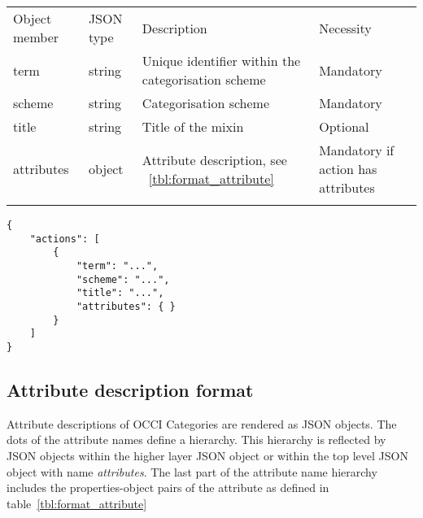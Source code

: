 \documentclass[10pt,a4paper]{article}
\begin{document}
 {
    \begin{tabular}{llll}
    \toprule
    Object member & JSON type & Description & Necessity\\
    \colrule
    term & string & Unique identifier within the categorisation scheme & Mandatory\\
    scheme & string & Categorisation scheme & Mandatory\\
    title & string & Title of the mixin & Optional\\
    attributes & object & Attribute description, see ~\ref{tbl:format_attribute} & Mandatory if action has attributes\\
    \botrule
    \end{tabular}
}

\begin{verbatim}
{
    "actions": [
        {
            "term": "...",
            "scheme": "...",
            "title": "...",
            "attributes": { }
        }
	]
}
\end{verbatim}

\subsection{Attribute description format}
\label{sec:format_attribute_description}

Attribute descriptions of OCCI Categories are rendered as JSON objects. The dots of the attribute names define a hierarchy. This hierarchy is reflected by JSON objects within the higher layer JSON object or within the top level JSON object with name {\em attributes}. The last part of the attribute name hierarchy includes the properties-object pairs of the attribute as defined in table~\ref{tbl:format_attribute}
\end{document}
